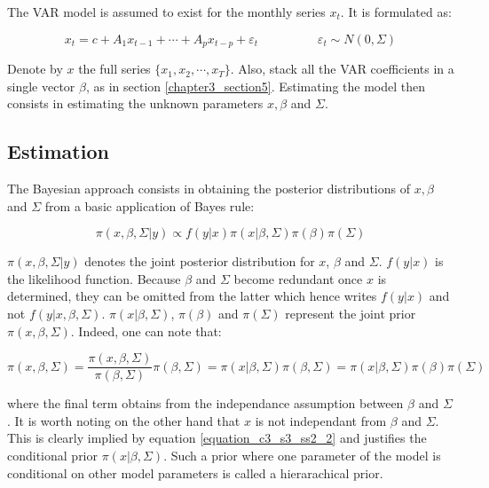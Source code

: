 The VAR model is assumed to exist for the monthly series $x_t$. It is formulated as:

\begin{equation}
x_t = c + A_1 x_{t-1} + \cdots + A_p x_{t-p} + \varepsilon_t \hspace{2cm}
\varepsilon_t \sim N(0, \Sigma)
\label{equation_c3_s3_ss1_1}
\end{equation}

Denote by $x$ the full series $\{x_1, x_2, \cdots, x_T\}$. Also, stack all the VAR coefficients in a single vector $\beta$, as in section \ref{chapter3_section5}. Estimating the model then consists in estimating the unknown parameters $x, \beta$ and $\Sigma$.



\subsection{Estimation}
\label{chapter3_section3_subsection2}


The Bayesian approach consists in obtaining the posterior distributions of $x, \beta$ and $\Sigma$ from a basic application of Bayes rule:

\begin{equation}
\pi(x, \beta, \Sigma| y) \propto f(y|x) \pi(x|\beta, \Sigma) \pi(\beta) \pi(\Sigma)
\label{equation_c3_s3_ss2_1}
\end{equation}

$\pi(x, \beta, \Sigma| y)$ denotes the joint posterior distribution for $x$, $\beta$ and $\Sigma$. $f(y|x)$  is the likelihood function. Because $\beta$ and $\Sigma$ become redundant once $x$ is determined, they can be omitted from the latter which hence writes $f(y|x)$ and not $f(y|x, \beta, \Sigma)$. $\pi(x|\beta, \Sigma)$, $\pi(\beta)$ and $\pi(\Sigma)$ represent the joint prior $\pi(x, \beta, \Sigma)$. Indeed, one can note that:

\begin{equation}
\pi(x, \beta, \Sigma) = \frac{\pi(x, \beta, \Sigma)}{\pi(\beta, \Sigma)} \pi(\beta, \Sigma)
= \pi(x|\beta, \Sigma) \pi(\beta, \Sigma) = \pi(x|\beta, \Sigma) \pi(\beta) \pi(\Sigma)
\label{equation_c3_s3_ss2_2}
\end{equation}

where the final term obtains from the independance assumption between $\beta$ and $\Sigma$. It is worth noting on the other hand that $x$ is not independant from $\beta$ and $\Sigma$. This is clearly implied by equation \ref{equation_c3_s3_ss2_2} and justifies the conditional prior $\pi(x|\beta, \Sigma)$. Such a prior where one parameter of the model is conditional on other model parameters is called a hierarachical prior.

